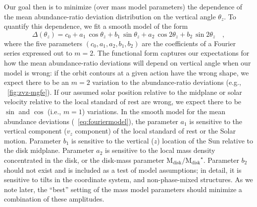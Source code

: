\documentclass[modern]{aastex63}
\newcommand{\mdisk}{\ensuremath{\mathrm{M}_\mathrm{disk}}}
\newcommand{\mratio}{\ensuremath{\mdisk / \mdisk^\star}}
\begin{document}
Our goal then is to minimize (over mass model parameters) the dependence of the
mean abundance-ratio deviation distribution on the vertical angle $\theta_z$.
To quantify this dependence, we fit a smooth model of the form
\begin{equation}
  \Delta(\theta_z) = c_0 + a_1\,\cos  \theta_z + b_1\,\sin    \theta_z
                         + a_2\,\cos 2\theta_z + b_2\,\sin 2\theta_z \quad,
                         \label{eq:fouriermodel}
\end{equation}
where the five parameters $(c_0, a_1, a_2, b_1, b_2)$ are the coefficients of a
Fourier series expressed out to $m=2$.
The functional form captures our expectations for how the mean abundance-ratio
deviations will depend on vertical angle when our model is wrong:
if the orbit contours at a given action have the wrong shape, we expect there to
be an $m=2$ variation to the abundance-ratio deviations (e.g.,
\figurename~\ref{fig:zvz-mgfe}).
If our assumed solar position relative to the midplane or solar velocity
relative to the local standard of rest are wrong, we expect there to be $\sin$
and $\cos$ (i.e., $m=1$) variations.
In the smooth model for the mean abundance deviations
(\equationname~\ref{eq:fouriermodel}), the parameter $a_1$ is sensitive to the
vertical component ($v_z$ component) of the local standard of rest or the Solar
motion.
Parameter $b_1$ is sensitive to the vertical ($z$) location of the Sun relative
to the disk midplane.
Parameter $a_2$ is sensitive to the local mass density concentrated in the disk,
or the disk-mass parameter \mratio.
Parameter $b_2$ should not exist and is included as a test of model assumptions;
in detail, it is sensitive to tilts in the coordinate system, and
non-phase-mixed structures.
As we note later, the ``best'' setting of the mass model parameters should
minimize a combination of these amplitudes.
\end{document}
